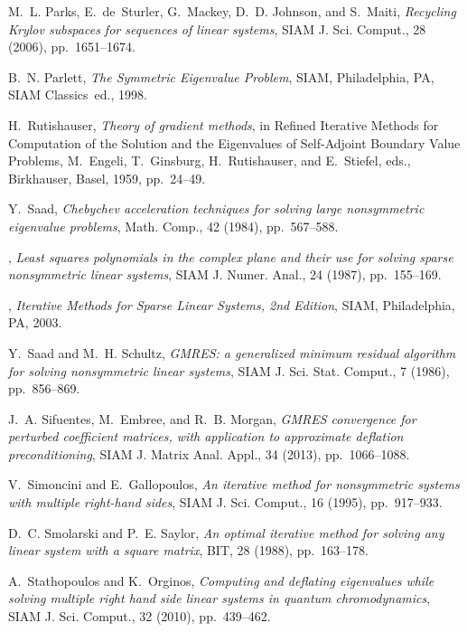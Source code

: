 \documentclass{siamart}
\begin{document}
\begin{thebibliography}{10}
{\sc M.~L. Parks, E.~de~Sturler, G.~Mackey, D.~D. Johnson, and S.~Maiti}, {\em
  Recycling {K}rylov subspaces for sequences of linear systems}, SIAM J. Sci.
  Comput., 28 (2006), pp.~1651--1674.

{\sc B.~N. Parlett}, {\em The Symmetric Eigenvalue Problem}, SIAM,
  Philadelphia, PA, {SIAM} {Classics}~ed., 1998.

{\sc H.~Rutishauser}, {\em Theory of gradient methods}, in Refined Iterative
  Methods for Computation of the Solution and the Eigenvalues of Self-Adjoint
  Boundary Value Problems, M.~Engeli, T.~Ginsburg, H.~Rutishauser, and
  E.~Stiefel, eds., Birkhauser, Basel, 1959, pp.~24--49.

{\sc Y.~Saad}, {\em {C}hebychev acceleration techniques for solving large
  nonsymmetric eigenvalue problems}, Math. Comp., 42 (1984), pp.~567--588.

\leavevmode\vrule height 2pt depth -1.6pt width 23pt, {\em Least squares
  polynomials in the complex plane and their use for solving sparse
  nonsymmetric linear systems}, SIAM J. Numer. Anal., 24 (1987), pp.~155--169.

\leavevmode\vrule height 2pt depth -1.6pt width 23pt, {\em Iterative Methods
  for Sparse Linear Systems, 2nd Edition}, SIAM, Philadelphia, PA, 2003.

{\sc Y.~Saad and M.~H. Schultz}, {\em {GMRES}: a generalized minimum residual
  algorithm for solving nonsymmetric linear systems}, SIAM J. Sci. Stat.
  Comput., 7 (1986), pp.~856--869.

{\sc J.~A. Sifuentes, M.~Embree, and R.~B. Morgan}, {\em {GMRES} convergence
  for perturbed coefficient matrices, with application to approximate deflation
  preconditioning}, SIAM J. Matrix Anal. Appl., 34 (2013), pp.~1066--1088.

{\sc V.~Simoncini and E.~Gallopoulos}, {\em An iterative method for
  nonsymmetric systems with multiple right-hand sides}, SIAM J. Sci. Comput.,
  16 (1995), pp.~917--933.

{\sc D.~C. Smolarski and P.~E. Saylor}, {\em An optimal iterative method for
  solving any linear system with a square matrix}, BIT, 28 (1988),
  pp.~163--178.

{\sc A.~Stathopoulos and K.~Orginos}, {\em Computing and deflating eigenvalues
  while solving multiple right hand side linear systems in quantum
  chromodynamics}, SIAM J. Sci. Comput., 32 (2010), pp.~439--462.


\end{thebibliography}
\end{document}
